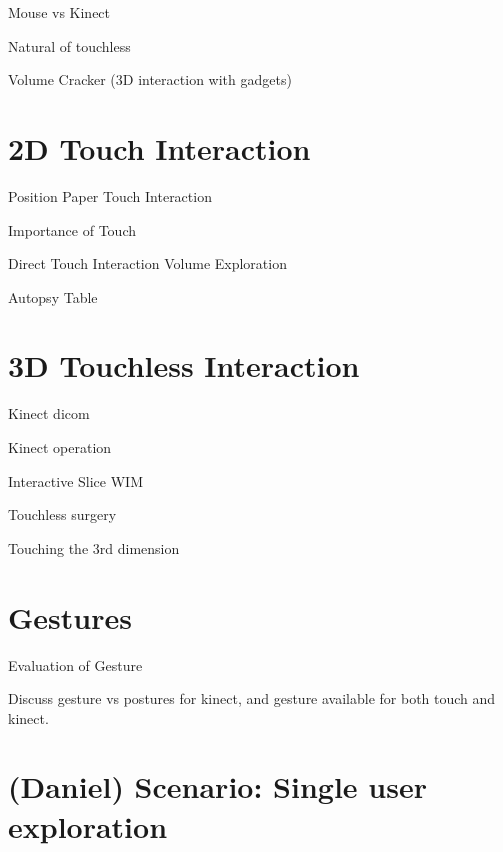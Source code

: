 \documentclass[review,journal]{vgtc}         %
\begin{document}
Mouse vs Kinect \cite{doi:10.1117/12.2006994}

Natural of touchless \cite{O'hara:2013:NTP:2442106.2442111}

Volume Cracker (3D interaction with gadgets) \cite{Laha:2013:VCB:2491367.2491368}

\section{2D Touch Interaction}

Position Paper Touch Interaction \cite{isenberg:hal-00781512}

Importance of Touch \cite{Robles-De-La-Torre:2006:IST:1158827.1159097}

Direct Touch Interaction Volume Exploration \cite{Klein:2012:DSD:2322389.2322403}

Autopsy Table \cite{LRFPY11}

\section{3D Touchless Interaction}

Kinect dicom \cite{zora82163}

Kinect operation \cite{OHaraGSPVMCCRDC14}

Interactive Slice WIM \cite{Coffey:2012:ISW:2360744.2360843}

Touchless surgery \cite{Mentis:2012:IPI:2207676.2208536}

Touching the 3rd dimension \cite{DBLP:journals/dagstuhl-reports/KeefeKSR12}

\section{Gestures}

Evaluation of Gesture \cite{Kirmizibayrak:2011:EGB:2087756.2087764}

Discuss gesture vs postures \cite{isenberg:hal-00781237} for kinect, and gesture available for both touch and kinect.

\section{(Daniel) Scenario: Single user exploration}
\end{document}
